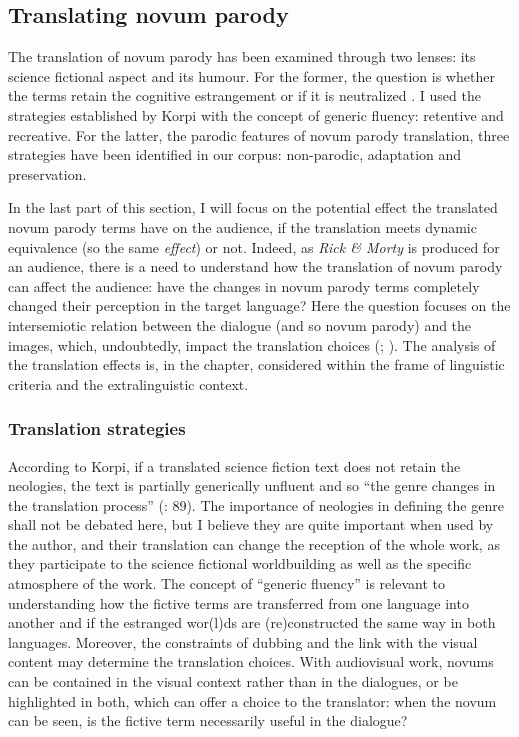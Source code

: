 \documentclass[output=paper]{langscibook}
\begin{document}
\subsection{Translating novum parody}

The translation of novum parody has been examined through two lenses: its science fictional aspect and its humour. For the former, the question is whether the terms retain the cognitive estrangement or if it is neutralized \citep[93]{Korpi2017}. I used the strategies established by Korpi with the concept of generic fluency: retentive and recreative. For the latter, the parodic features of novum parody translation, three strategies have been identified in our corpus: non-parodic, adaptation and preservation.

In the last part of this section, I will focus on the potential effect the translated novum parody terms have on the audience, if the translation meets dynamic equivalence (so the same \textit{effect}) or not. Indeed, as \textit{Rick \& Morty} is produced for an audience, there is a need to understand how the translation of novum parody can affect the audience: have the changes in novum parody terms completely changed their perception in the target language? Here the question focuses on the intersemiotic relation between the dialogue (and so novum parody) and the images, which, undoubtedly, impact the translation choices (\citealt{Torresi2008}; \citealt{KourdisKukkonen2015}). The analysis of the translation effects is, in the chapter, considered within the frame of linguistic criteria and the extralinguistic context.

\subsubsection{Translation strategies}

According to Korpi, if a translated science fiction text does not retain the neologies, the text is partially generically unfluent and so “the genre changes in the translation process” (\citealt{Korpi2017}: 89). The importance of neologies in defining the genre shall not be debated here, but I believe they are quite important when used by the author, and their translation can change the reception of the whole work, as they participate to the science fictional worldbuilding as well as the specific atmosphere of the work. The concept of “generic fluency” is relevant to understanding how the fictive terms are transferred from one language into another and if the estranged wor(l)ds are (re)constructed the same way in both languages. Moreover, the constraints of dubbing and the link with the visual content may determine the translation choices. With audiovisual work, novums can be contained in the visual context rather than in the dialogues, or be highlighted in both, which can offer a choice to the translator: when the novum can be seen, is the fictive term necessarily useful in the dialogue?
\end{document}
